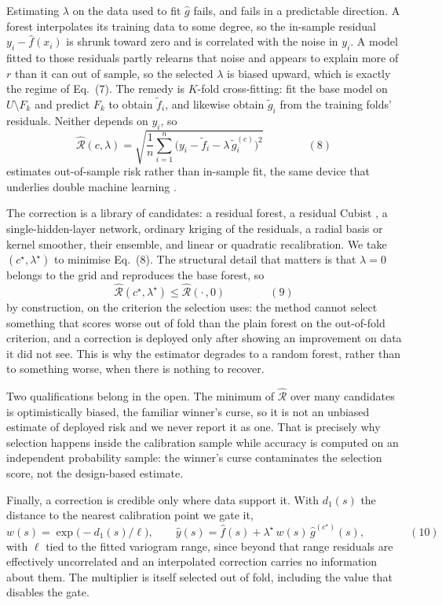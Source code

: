 \documentclass[preprint,12pt,authoryear]{elsarticle}
\newcommand{\eqnum}[1]{\qquad\qquad\mathrm{(#1)}}
\begin{document}
Estimating $\lambda$ on the data used to fit $\hat g$ fails, and fails in a
predictable direction. A forest interpolates its training data to some degree,
so the in-sample residual $y_i - \hat f(x_i)$ is shrunk toward zero and is
correlated with the noise in $y_i$. A model fitted to those residuals partly
relearns that noise and appears to explain more of $r$ than it can out of
sample, so the selected $\lambda$ is biased upward, which is exactly the regime
of Eq.~(7). The remedy is $K$-fold cross-fitting: fit the base model on
$U \setminus F_k$ and predict $F_k$ to obtain $\tilde f_i$, and likewise obtain
$\tilde g_i$ from the training folds' residuals. Neither depends on $y_i$, so
\[
\widehat{\mathcal{R}}(c,\lambda)
= \sqrt{\frac{1}{n}\sum_{i=1}^{n}\big(y_i - \tilde f_i - \lambda\,\tilde g_i^{(c)}\big)^2}
\eqnum{8}
\]
estimates out-of-sample risk rather than in-sample fit, the same device that
underlies double machine learning \citep{chernozhukov2018}.

The correction is a library of candidates: a residual forest, a residual Cubist
\citep{quinlan1992}, a single-hidden-layer network, ordinary kriging of the
residuals, a radial basis or kernel smoother, their ensemble, and linear or
quadratic recalibration. We take $(c^\star,\lambda^\star)$ to minimise Eq.~(8).
The structural detail that matters is that $\lambda = 0$ belongs to the grid and
reproduces the base forest, so
\[
\widehat{\mathcal{R}}(c^\star,\lambda^\star) \le \widehat{\mathcal{R}}(\cdot\,,0)
\eqnum{9}
\]
by construction, on the criterion the selection uses: the method cannot select
something that scores worse out of fold than the plain forest
on the out-of-fold criterion, and a correction is deployed only after showing an
improvement on data it did not see. This is why the estimator degrades to a
random forest, rather than to something worse, when there is nothing to recover.

Two qualifications belong in the open. The minimum of $\widehat{\mathcal{R}}$
over many candidates is optimistically biased, the familiar winner's curse, so
it is not an unbiased estimate of deployed risk and we never report it as one.
That is precisely why selection happens inside the calibration sample while
accuracy is computed on an independent probability sample: the winner's curse
contaminates the selection score, not the design-based estimate.

Finally, a correction is credible only where data support it. With $d_1(s)$ the
distance to the nearest calibration point we gate it,
\[
w(s) = \exp\!\big(-d_1(s)/\ell\big),
\qquad
\hat y(s) = \hat f(s) + \lambda^\star\, w(s)\, \hat g^{(c^\star)}(s),
\eqnum{10}
\]
with $\ell$ tied to the fitted variogram range, since beyond that range
residuals are effectively uncorrelated and an interpolated correction carries no
information about them. The multiplier is itself selected out of fold, including
the value that disables the gate.
\end{document}
